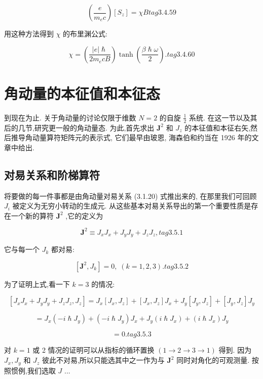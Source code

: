 $$
\left( \frac{e}{{m}_{e}c}\right) \left\lbrack {S}_{z}\right\rbrack = {\chi B} tag{3. 4.59}
$$

用这种方法得到 $\chi$ 的布里渊公式:

$$
\chi = \left( \frac{\left| e\right| \hslash }{2{m}_{e}{cB}}\right) \tanh \left( \frac{\beta \hslash \omega }{2}\right) . tag{3. 4.60}
$$

\section{角动量的本征值和本征态}

到现在为止. 关于角动量的讨论仅限于维数 $N = 2$ 的自旋 $\frac{1}{2}$ 系统. 在这一节以及其后的几节,研究更一般的角动量态. 为此,首先求出 ${\mathbf{J}}^{2}$ 和 ${J}_{z}$ 的本征值和本征右矢,然后推导角动量算符矩阵元的表示式, 它们最早由玻恩, 海森伯和约当在 1926 年的文章中给出.

\subsection{对易关系和阶梯算符}

将要做的每一件事都是由角动量对易关系 (3.1.20) 式推出来的, 在那里我们可回顾 ${J}_{i}$ 被定义为无穷小转动的生成元. 从这些基本对易关系导出的第一个重要性质是存在一个新的算符 ${\mathbf{J}}^{2}$ ,它的定义为

$$
{\mathbf{J}}^{2} \equiv {J}_{x}{J}_{x} + {J}_{y}{J}_{y} + {J}_{z}{J}_{z}, tag{3.5.1}
$$

它与每一个 ${J}_{k}$ 都对易:

$$
\left\lbrack {{\mathbf{J}}^{2},{J}_{k}}\right\rbrack = 0,\;\left( {k = 1,2,3}\right) . tag{3.5.2}
$$

为了证明上式,看一下 $k = 3$ 的情况:

$$
\left\lbrack {{J}_{x}{J}_{x} + {J}_{y}{J}_{y} + {J}_{z}{J}_{z},{J}_{z}}\right\rbrack = {J}_{x}\left\lbrack {{J}_{x},{J}_{z}}\right\rbrack + \left\lbrack {{J}_{x},{J}_{z}}\right\rbrack {J}_{x} + {J}_{y}\left\lbrack {{J}_{y},{J}_{z}}\right\rbrack + \left\lbrack {{J}_{y},{J}_{z}}\right\rbrack {J}_{y}
$$

$$
= {J}_{x}\left( {-i\hslash {J}_{y}}\right) + \left( {-i\hslash {J}_{y}}\right) {J}_{x} + {J}_{y}\left( {i\hslash {J}_{x}}\right) + \left( {i\hslash {J}_{x}}\right) {J}_{y}
$$

$$
= 0\text{.} tag{3.5.3}
$$

对 $k = 1$ 或 2 情况的证明可以从指标的循环置换 $\left( {1 \rightarrow 2 \rightarrow 3 \rightarrow 1}\right)$ 得到. 因为 ${J}_{x},{J}_{y}$ 和 ${J}_{z}$ 彼此不对易,所以只能选其中之一作为与 ${\mathbf{J}}^{2}$ 同时对角化的可观测量. 按照惯例,我们选取 $J$ ...


